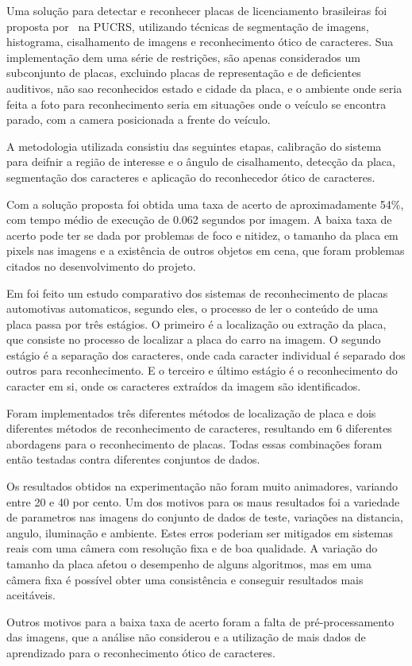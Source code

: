 
Uma solução para detectar e reconhecer placas de licenciamento brasileiras foi
proposta por~\cite{serro2012deteccao} na PUCRS, utilizando técnicas de
segmentação de imagens, histograma, cisalhamento de imagens e reconhecimento
ótico de caracteres. Sua implementação dem uma série de restrições, são apenas
considerados um subconjunto de placas, excluindo placas de representação e de
deficientes auditivos, não sao reconhecidos estado e cidade da placa, e o
ambiente onde seria feita a foto para reconhecimento seria em situações onde o
veículo se encontra parado, com a camera posicionada a frente do veículo.

A metodologia utilizada consistiu das seguintes etapas, calibração do sistema
para deifnir a região de interesse e o ângulo de cisalhamento, detecção da
placa, segmentação dos caracteres e aplicação do reconhecedor ótico de
caracteres.

Com a solução proposta foi obtida uma taxa de acerto de aproximadamente 54\%,
com tempo médio de execução de 0.062 segundos por imagem. A baixa taxa de acerto
pode ter se dada por problemas de foco e nitidez, o tamanho da placa em pixels
nas imagens e a existência de outros objetos em cena, que foram problemas
citados no desenvolvimento do projeto.

Em \cite{ahmad2015automatic} foi feito um estudo comparativo dos sistemas de
reconhecimento de placas automotivas automaticos, segundo eles, o processo de
ler o conteúdo de uma placa passa por três estágios. O primeiro é a localização
ou extração da placa, que consiste no processo de localizar a placa do carro na
imagem. O segundo estágio é a separação dos caracteres, onde cada caracter
individual é separado dos outros para reconhecimento. E o terceiro e último
estágio é o reconhecimento do caracter em si, onde os caracteres extraídos da
imagem são identificados.

Foram implementados três diferentes métodos de localização de placa e dois
diferentes métodos de reconhecimento de caracteres, resultando em 6 diferentes
abordagens para o reconhecimento de placas. Todas essas combinações foram então
testadas contra diferentes conjuntos de dados.

Os resultados obtidos na experimentação não foram muito animadores, variando 
entre 20 e 40 por cento. Um dos motivos para os maus resultados foi a variedade
de parametros nas imagens do conjunto de dados de teste, variações na distancia, 
angulo, iluminação e ambiente. Estes erros poderiam ser mitigados em sistemas
reais com uma câmera com resolução fixa e de boa qualidade. A variação do tamanho 
da placa afetou o desempenho de alguns algoritmos, mas em uma câmera fixa é possível
obter uma consistência e conseguir resultados mais aceitáveis.

Outros motivos para a baixa taxa de acerto foram a falta de pré-processamento das imagens,
que a análise não considerou e a utilização de mais dados de aprendizado para o reconhecimento
ótico de caracteres.

